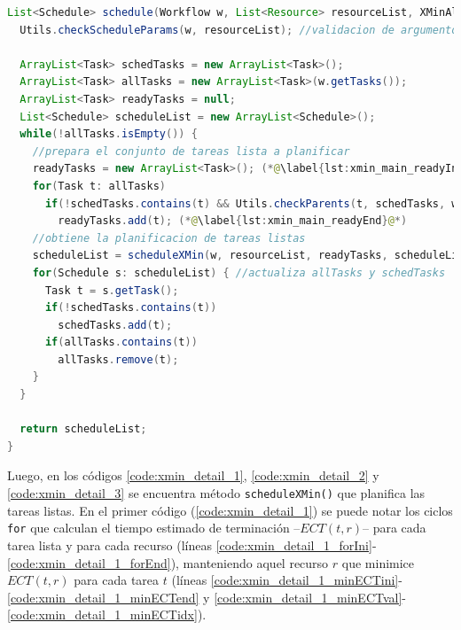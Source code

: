 \begin{lstlisting}[language=java,label={lst:xmin_main},caption={Método principal para los algoritmos MaxMin y MinMin.},float]
List<Schedule> schedule(Workflow w, List<Resource> resourceList, XMinAlgorithm alg) {
  Utils.checkScheduleParams(w, resourceList); //validacion de argumentos

  ArrayList<Task> schedTasks = new ArrayList<Task>();
  ArrayList<Task> allTasks = new ArrayList<Task>(w.getTasks());
  ArrayList<Task> readyTasks = null;
  List<Schedule> scheduleList = new ArrayList<Schedule>();
  while(!allTasks.isEmpty()) {
    //prepara el conjunto de tareas lista a planificar
    readyTasks = new ArrayList<Task>(); (*@\label{lst:xmin_main_readyIni}@*)
    for(Task t: allTasks)
      if(!schedTasks.contains(t) && Utils.checkParents(t, schedTasks, w))
        readyTasks.add(t); (*@\label{lst:xmin_main_readyEnd}@*)
    //obtiene la planificacion de tareas listas
    scheduleList = scheduleXMin(w, resourceList, readyTasks, scheduleList, alg); (*@\label{lst:xmin_main_sched}@*)
    for(Schedule s: scheduleList) { //actualiza allTasks y schedTasks
      Task t = s.getTask();
      if(!schedTasks.contains(t))
        schedTasks.add(t);
      if(allTasks.contains(t))
        allTasks.remove(t);
    }
  }

  return scheduleList;
}
\end{lstlisting}

Luego, en los códigos \ref{code:xmin_detail_1}, \ref{code:xmin_detail_2} y \ref{code:xmin_detail_3} se encuentra método \texttt{scheduleXMin()} que planifica las tareas listas. En el primer código (\ref{code:xmin_detail_1}) se puede notar los ciclos \texttt{for} que calculan el tiempo estimado de terminación --$ECT(t,r)$-- para cada tarea lista y para cada recurso (líneas \ref{code:xmin_detail_1_forIni}-\ref{code:xmin_detail_1_forEnd}), manteniendo aquel recurso $r$ que minimice $ECT(t,r)$ para cada tarea $t$ (líneas \ref{code:xmin_detail_1_minECTini}-\ref{code:xmin_detail_1_minECTend} y \ref{code:xmin_detail_1_minECTval}-\ref{code:xmin_detail_1_minECTidx}).

